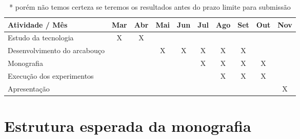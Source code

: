 \documentclass[11pt,a4paper]{article}
\begin{document}
\begin{table}[h]
  \begin{center}
    \begin{tabular}{ | p{5.2cm} || c | c | c | c | c | c | c | c | c |}
      \hline
      \textbf{Atividade / Mês}              & \textbf{Mar} & \textbf{Abr} & \textbf{Mai} & \textbf{Jun} & \textbf{Jul} & \textbf{Ago} & \textbf{Set} & \textbf{Out} & \textbf{Nov} \\
      \hline
      \hline
      Estudo da tecnologia                              &  X  &  X  &     &     &     &     &     &     &     \\
      \hline
      Desenvolvimento do arcabouço                      &     &     &  X  &  X  &  X  &  X  &  X  &     &     \\
      \hline
      Monografia                                        &     &     &     &     &  X  &  X  &  X  &  X  &     \\
      \hline
      Execução dos experimentos                         &     &     &     &     &     &  X  &  X  &  X  &     \\
      \hline
      Apresentação                                      &     &     &     &     &     &     &     &     &  X  \\
      \hline
    \end{tabular}
  \end{center}
  \caption{* porém não temos certeza se teremos os resultados antes do prazo limite para submissão}
\end{table}

\section{Estrutura esperada da monografia}
\end{document}
